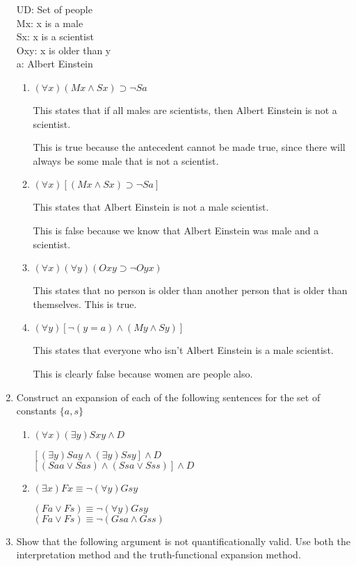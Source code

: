 \documentclass[12pt,letterpaper]{article}
\begin{document}
\begin{enumerate}
      UD: Set of people \\
      Mx: x is a male \\
      Sx: x is a scientist \\
      Oxy: x is older than y \\
      a: Albert Einstein

      \begin{enumerate}
        \item $(\forall x)(Mx \land Sx) \supset \neg Sa$

          This states that if all males are scientists,
          then Albert Einstein is not a scientist.

          This is true because the antecedent cannot be made true,
          since there will always be some male that is not a scientist.
        \item $(\forall x)[(Mx \land Sx) \supset \neg Sa]$

          This states that Albert Einstein is not a male scientist.

          This is false because we know that Albert Einstein was male and a scientist.
        \item $(\forall x)(\forall y)(Oxy \supset \neg Oyx)$

          This states that no person is older than another person that is older than themselves.
          This is true.
        \item $(\forall y)[\neg (y = a) \land (My \land Sy)]$

          This states that everyone who isn't Albert Einstein is a male scientist.

          This is clearly false because women are people also.
      \end{enumerate}
    \item Construct an expansion of each of the following sentences for the set of constants $\{ a, s \}$
      \begin{enumerate}
        \item $(\forall x)(\exists y)Sxy \land D$

          $[(\exists y)Say \land (\exists y)Ssy] \land D$ \\
          $[(Saa \lor Sas) \land (Ssa \lor Sss)] \land D$
        \item $(\exists x)Fx \equiv \neg (\forall y)Gsy$

          $(Fa \lor Fs) \equiv \neg (\forall y)Gsy$ \\
          $(Fa \lor Fs) \equiv \neg (Gsa \land Gss)$
      \end{enumerate}
    \item
      Show that the following argument is not quantificationally valid.
      Use both the interpretation method and the truth-functional expansion method.


\end{enumerate}
\end{document}
